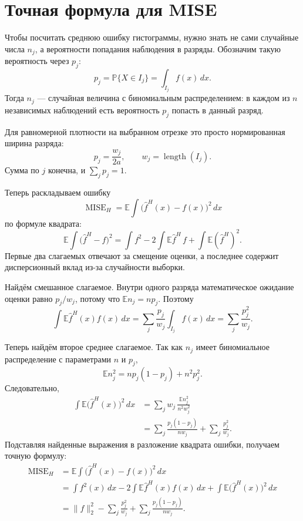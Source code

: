 \documentclass[12pt,a4paper]{article}
\begin{document}
\section*{Точная формула для MISE}

Чтобы посчитать среднюю ошибку гистограммы, нужно знать не сами случайные
числа $n_j$, а вероятности попадания наблюдения в разряды. Обозначим такую
вероятность через $p_j$:
\[
p_j=\mathbb P\{X\in I_j\}
=\int_{I_j} f(x)\,dx.
\]
Тогда $n_j$ --- случайная величина с биномиальным распределением: в каждом
из $n$ независимых наблюдений есть вероятность $p_j$ попасть в данный
разряд.

Для равномерной плотности на выбранном отрезке это просто нормированная
ширина разряда:
\[
p_j=\frac{w_j}{2a},
\qquad
w_j=\operatorname{length}(I_j).
\]
Сумма по $j$ конечна, и $\sum_j p_j=1$.

Теперь раскладываем ошибку
\[
\operatorname{MISE}_H
=
\mathbb E\int\bigl(\widehat f^H(x)-f(x)\bigr)^2\,dx
\]
по формуле квадрата:
\[
\mathbb E\int\bigl(\widehat f^H-f\bigr)^2
=
\int f^2
-2\int \mathbb E\widehat f^H\, f
+\int \mathbb E(\widehat f^H)^2.
\]
Первые два слагаемых отвечают за смещение оценки, а последнее содержит
дисперсионный вклад из-за случайности выборки.

Найдём смешанное слагаемое. Внутри одного разряда математическое ожидание
оценки равно $p_j/w_j$, потому что $\mathbb E n_j=np_j$. Поэтому
\[
\int \mathbb E\widehat f^H(x)f(x)\,dx
=\sum_j \frac{p_j}{w_j}\int_{I_j} f(x)\,dx
=\sum_j \frac{p_j^2}{w_j}.
\]

Теперь найдём второе среднее слагаемое. Так как $n_j$ имеет биномиальное
распределение с параметрами $n$ и $p_j$,
\[
\mathbb E n_j^2=np_j(1-p_j)+n^2p_j^2.
\]
Следовательно,
\[
\begin{aligned}
\int \mathbb E\bigl(\widehat f^H(x)\bigr)^2\,dx
&=\sum_j w_j\,\frac{\mathbb E n_j^2}{n^2w_j^2}\\
&=\sum_j\frac{p_j(1-p_j)}{nw_j}
+\sum_j\frac{p_j^2}{w_j}.
\end{aligned}
\]
Подставляя найденные выражения в разложение квадрата ошибки, получаем
точную формулу:
\[
\begin{aligned}
\operatorname{MISE}_H
&=\mathbb E\int\bigl(\widehat f^H(x)-f(x)\bigr)^2\,dx\\
&=\int f^2(x)\,dx
-2\int \mathbb E\widehat f^H(x)f(x)\,dx
+\int \mathbb E\bigl(\widehat f^H(x)\bigr)^2\,dx\\
&=\|f\|_2^2
-\sum_j\frac{p_j^2}{w_j}
+\sum_j\frac{p_j(1-p_j)}{nw_j}.
\end{aligned}
\]
\end{document}
